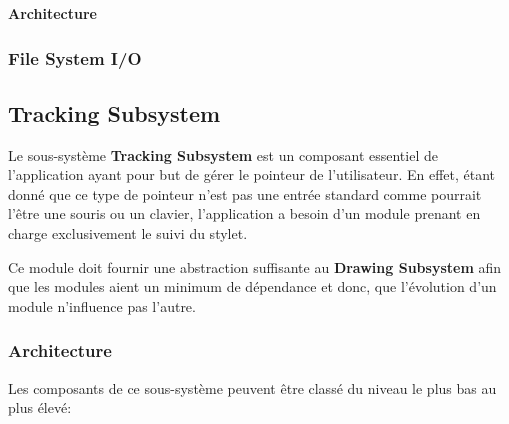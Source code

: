 \documentclass[11pt,a4paper,oldfontcommands]{memoir}
\begin{document}
\textbf{Architecture}

\subsubsection{File System I/O}

\newpage

\subsection{Tracking Subsystem}

Le sous-système \textbf{Tracking Subsystem} est un composant essentiel de l'application ayant pour but de gérer le pointeur de l'utilisateur. En effet, étant donné que ce type de pointeur n'est pas une entrée standard comme pourrait l'être une souris ou un clavier, l'application a besoin d'un module prenant en charge exclusivement le suivi du stylet.

Ce module doit fournir une abstraction suffisante au \textbf{Drawing Subsystem} afin que les modules aient un minimum de dépendance et donc, que l'évolution d'un module n'influence pas l'autre.

\subsubsection{Architecture}

Les composants de ce sous-système peuvent être classé du niveau le plus bas au plus élevé:
\end{document}
